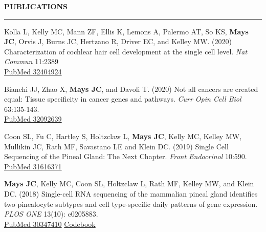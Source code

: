 \documentclass[11pt, letterpaper]{article}
\newenvironment{CVSection}{
\begin{addmargin}[2em]{0em}
\begin{samepage}}
{\end{samepage}
\end{addmargin}\bigskip}
\newcommand{\CVHeading}[1]{
\MakeUppercase{\bf #1}
\smallskip
\hrule
\medskip
}
\begin{document}


\newpage

\CVHeading{Publications}
\begin{CVSection}

Kolla L, Kelly MC, Mann ZF, Ellis K, Lemons A, Palermo AT, So KS, \textbf{Mays JC}, Orvis J, Burns JC, Hertzano R, Driver EC, and Kelley MW. (2020) Characterization of cochlear hair cell development at the single cell level. \emph{Nat Commun} 11:2389\\
\hspace{2 in}\href{https://www.ncbi.nlm.nih.gov/pubmed/32404924}{\faFileTextO\hspace{1mm}PubMed 32404924}\medskip

Bianchi JJ, Zhao X, \textbf{Mays JC}, and Davoli T. (2020) Not all cancers are created equal: Tissue specificity in cancer genes and pathways. \emph{Curr Opin Cell Biol} 63:135-143.\\
\hspace{2 in}\href{https://www.ncbi.nlm.nih.gov/pubmed/32092639}{\faFileTextO\hspace{1mm}PubMed 32092639}\medskip

Coon SL, Fu C, Hartley S, Holtzclaw L, \textbf{Mays JC}, Kelly MC, Kelley MW, Mullikin JC, Rath MF, Savastano LE and Klein DC. (2019) Single Cell Sequencing of the Pineal Gland: The Next Chapter. \emph{Front Endocrinol} 10:590.\\
\hspace{2 in}\href{https://www.ncbi.nlm.nih.gov/pubmed/31616371}{\faFileTextO\hspace{1mm}PubMed 31616371}\medskip

\textbf{Mays JC}, Kelly MC, Coon SL, Holtzclaw L, Rath MF, Kelley MW, and Klein DC. (2018) Single-cell RNA sequencing of the mammalian pineal gland identifies two pinealocyte subtypes and cell type-specific daily patterns of gene expression. \emph{PLOS ONE} 13(10): e0205883.\\
\hspace{2 in}\href{https://www.ncbi.nlm.nih.gov/pubmed/30347410}{\faFileTextO\hspace{1mm}PubMed 30347410}
\hspace{2mm}\href{https://github.com/joeymays/PinealGland_SingleCell}{\faCode\hspace{1mm}Codebook}\medskip

\end{CVSection}
\end{document}
